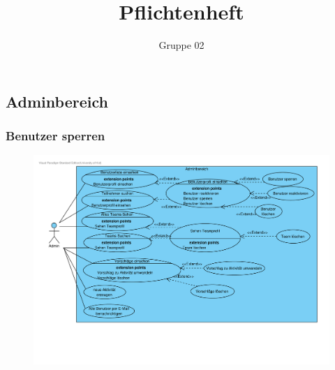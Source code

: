﻿\documentclass[10pt,a4paper]{article}
\author{Gruppe 02}
\title{Pflichtenheft}
\begin{document}
	\subsection{Adminbereich}
	\subsubsection{Benutzer sperren}
	\begin{figure}[h]
		\includegraphics[width=\linewidth]{gfx/webseite/adminbereich.pdf}
	\end{figure}
\end{document}
